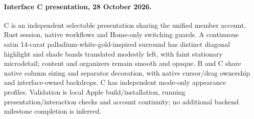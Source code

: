 \documentclass[11pt]{article}
\begin{document}
\paragraph{Interface C presentation, 28 October 2026.}
C is an independent selectable presentation sharing the unified member account,
Rust session, native workflows and Home-only switching guards. A continuous satin
14-carat palladium-white-gold-inspired surround has distinct diagonal highlight
and shade bands translated modestly left, with faint stationary microdetail;
content and organizers remain smooth and opaque. B and C share native column sizing
and separator decoration, with native cursor/drag ownership and interface-owned
backdrops. C has independent mode-only appearance profiles. Validation is local Apple
build/installation, running presentation/interaction checks and account continuity;
no additional backend milestone completion is inferred.
\end{document}
